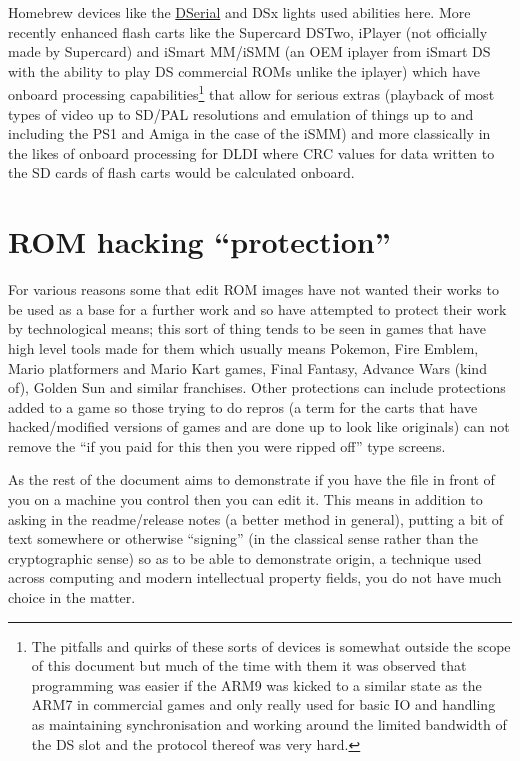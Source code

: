\documentclass[
]{book}
\begin{document}
Homebrew devices like the \href{http://natrium42.com/wiki/DSerial}{DSerial} and DSx lights used abilities here. More recently enhanced flash carts like the Supercard DSTwo, iPlayer (not officially made by Supercard) and iSmart MM/iSMM (an OEM iplayer from iSmart DS with the ability to play DS commercial ROMs unlike the iplayer) which have onboard processing capabilities\footnote{The pitfalls and quirks of these sorts of devices is somewhat outside the scope of this document but much of the time with them it was observed that programming was easier if the ARM9 was kicked to a similar state as the ARM7 in commercial games and only really used for basic IO and handling as maintaining synchronisation and working around the limited bandwidth of the DS slot and the protocol thereof was very hard.} that allow for serious extras (playback of most types of video up to SD/PAL resolutions and emulation of things up to and including the PS1 and Amiga in the case of the iSMM) and more classically in the likes of onboard processing for DLDI where CRC values for data written to the SD cards of flash carts would be calculated onboard.

\hypertarget{rom-hacking-protection}{%
\section{ROM hacking ``protection''}\label{rom-hacking-protection}}

For various reasons some that edit ROM images have not wanted their works to be used as a base for a further work and so have attempted to protect their work by technological means; this sort of thing tends to be seen in games that have high level tools made for them which usually means Pokemon, Fire Emblem, Mario platformers and Mario Kart games, Final Fantasy, Advance Wars (kind of), Golden Sun and similar franchises. Other protections can include protections added to a game so those trying to do repros (a term for the carts that have hacked/modified versions of games and are done up to look like originals) can not remove the ``if you paid for this then you were ripped off'' type screens.

As the rest of the document aims to demonstrate if you have the file in front of you on a machine you control then you can edit it. This means in addition to asking in the readme/release notes (a better method in general), putting a bit of text somewhere or otherwise ``signing'' (in the classical sense rather than the cryptographic sense) so as to be able to demonstrate origin, a technique used across computing and modern intellectual property fields, you do not have much choice in the matter.
\end{document}

